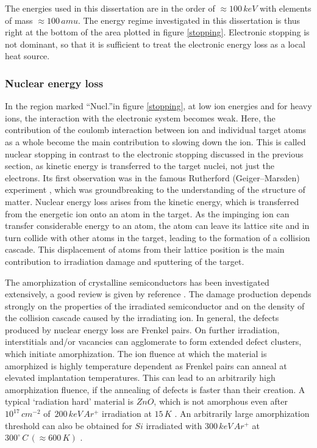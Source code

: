 The energies used in this dissertation are in the order of $\approx 100\,keV$ with elements of mass $\approx 100\,amu$. The energy regime investigated in this dissertation is thus right at the bottom of the area plotted in figure \ref{stopping}. Electronic stopping is not dominant, so that it is sufficient to treat the electronic energy loss as a local heat source.

\subsubsection{Nuclear energy loss}

In the region marked ``Nucl.''in figure \ref{stopping}, at low ion energies and for heavy ions, the interaction with the electronic system becomes weak. Here, the contribution of the coulomb interaction between ion and individual target atoms as a whole become the main contribution to slowing down the ion. This is called nuclear stopping in contrast to the electronic stopping discussed in the previous section, as kinetic energy is transferred to the target nuclei, not just the electrons. Its first observation was in the famous Rutherford (Geiger–Marsden) experiment \cite{rutherford_scattering_1911}, which was groundbreaking to the understanding of the structure of matter. Nuclear energy loss arises from the kinetic energy, which is transferred from the energetic ion onto an atom in the target. As the impinging ion can transfer considerable energy to an atom, the atom can leave its lattice site and in turn collide with other atoms in the target, leading to the formation of a collision cascade. This displacement of atoms from their lattice position is the main contribution to irradiation damage and sputtering of the target. 

The amorphization of crystalline semiconductors has been investigated extensively, a good review is given by reference \cite{wesch_damage_2012}. The damage production depends strongly on the properties of the irradiated semiconductor and on the density of the collision cascade caused by the irradiating ion. In general, the defects produced by nuclear energy loss are Frenkel pairs. On further irradiation, interstitials and/or vacancies can agglomerate to form extended defect clusters, which initiate amorphization. The ion fluence at which the material is amorphized is highly temperature dependent as Frenkel pairs can anneal at elevated implantation temperatures. This can lead to an arbitrarily high amorphization fluence, if the annealing of defects is faster than their creation. A typical `radiation hard' material is $ZnO$, which is not amorphous even after $10^{17}\,cm^{-2}$ of $\,200\,keV\,Ar^+$ irradiation at $15\,K$ \cite{wesch_damage_2012}. An arbitrarily large amorphization threshold can also be obtained for $Si$ irradiated with $300\,keV\,Ar^+$ at $300^\circ\,C\,(\approx 600\,K)$ \cite{pelaz_ion-beam-induced_2004}.

